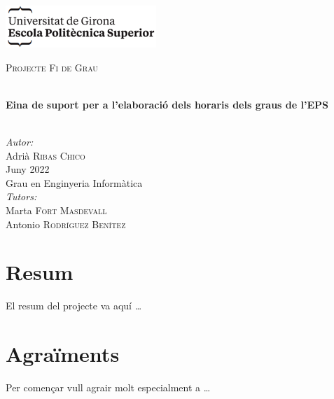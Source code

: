 \documentclass[a4paper,12pt]{ThesisStyle}
\begin{document}
\begin{titlepage}

\includegraphics[scale=0.9]{imatges/logo_eps.png} \\[1cm]
\begin{center}
\textsc{\Large Projecte Fi de Grau} \\[1cm]

\begin{spacing}{2}
\HRule \\
\textbf{\Huge Eina de suport per a l’elaboració dels horaris dels graus de l’EPS} \\
\HRule \\[0.5cm]
\end{spacing}

{
\large
\emph{Autor:} \\
Adrià \textsc{Ribas Chico} \\[1cm]
Juny 2022 \\[1cm]
Grau en Enginyeria Informàtica \\[1cm]
\emph{Tutors:} \\
Marta \textsc{Fort Masdevall} \\
Antonio \textsc{Rodríguez Benítez} \\
}

\end{center}
\end{titlepage}

\titlepage

\dominitoc


\chapter*{Resum}
\label{cap:resum}

El resum del projecte va aquí \ldots

\chapter*{Agraïments}
\label{cap:agraiments}

Per començar vull agrair molt especialment a \ldots


\tableofcontents
\end{document}
